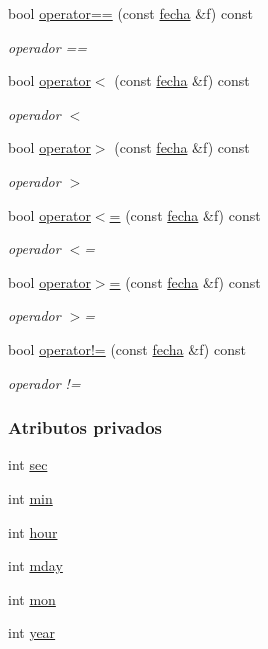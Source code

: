 \begin{DoxyCompactItemize}
bool \hyperlink{classfecha_ac971e131a6e3edf57c2313468524f364}{operator==} (const \hyperlink{classfecha}{fecha} \&f) const 
\begin{DoxyCompactList}\small\item\em operador == \end{DoxyCompactList}\item 
bool \hyperlink{classfecha_a27803300b9698e1a40ef48f2009948c5}{operator$<$} (const \hyperlink{classfecha}{fecha} \&f) const 
\begin{DoxyCompactList}\small\item\em operador $<$ \end{DoxyCompactList}\item 
bool \hyperlink{classfecha_aaded7646e80d88492b31b17b4fb001fd}{operator$>$} (const \hyperlink{classfecha}{fecha} \&f) const 
\begin{DoxyCompactList}\small\item\em operador $>$ \end{DoxyCompactList}\item 
bool \hyperlink{classfecha_a8dfb2f2a7424bdb1dacc6df122b0a0c8}{operator$<$=} (const \hyperlink{classfecha}{fecha} \&f) const 
\begin{DoxyCompactList}\small\item\em operador $<$= \end{DoxyCompactList}\item 
bool \hyperlink{classfecha_a98d0f3009cb7205b5ddb3b81596d9cc7}{operator$>$=} (const \hyperlink{classfecha}{fecha} \&f) const 
\begin{DoxyCompactList}\small\item\em operador $>$= \end{DoxyCompactList}\item 
bool \hyperlink{classfecha_a1f6d28759c45b138efb80d25a7c398b8}{operator!=} (const \hyperlink{classfecha}{fecha} \&f) const 
\begin{DoxyCompactList}\small\item\em operador != \end{DoxyCompactList}\end{DoxyCompactItemize}
\subsubsection*{Atributos privados}
\begin{DoxyCompactItemize}
\item 
int \hyperlink{classfecha_a09eb9f4865c9ff896f438b8df3cf6485}{sec}
\item 
int \hyperlink{classfecha_a3875f28ff6e7c383923c80e86afaec2e}{min}
\item 
int \hyperlink{classfecha_a895a2cc9dd11326a8392a4c6fc928a14}{hour}
\item 
int \hyperlink{classfecha_a9c1dc50e5f5efcd3e30a981bfd495b1d}{mday}
\item 
int \hyperlink{classfecha_a5c86be74f1215600f99798d54126ba16}{mon}
\item 
int \hyperlink{classfecha_a4d06534f05a6350ae229ce2b17b860e8}{year}
\end{DoxyCompactItemize}
